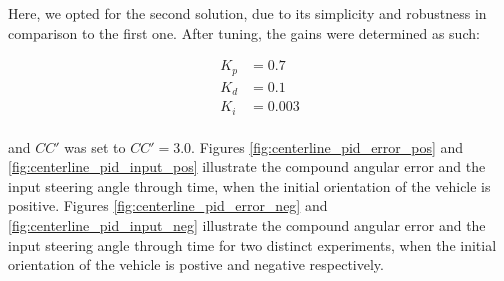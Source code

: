 Here, we opted for the second solution, due to its simplicity and robustness
in comparison to the first one. After tuning, the gains were determined as such:

\begin{align*}
  K_p &= 0.7 \\
  K_d &= 0.1 \\
  K_i &= 0.003 \\
\end{align*}

and $CC'$ was set to $CC' = 3.0$. Figures \ref{fig:centerline_pid_error_pos} and
\ref{fig:centerline_pid_input_pos} illustrate the compound angular error
and the input steering angle through time, when the initial orientation of the
vehicle is positive. Figures \ref{fig:centerline_pid_error_neg} and
\ref{fig:centerline_pid_input_neg} illustrate the compound angular error
and the input steering angle through time for two distinct experiments,
when the initial orientation of the vehicle is postive and negative respectively.



\noindent{}\\

